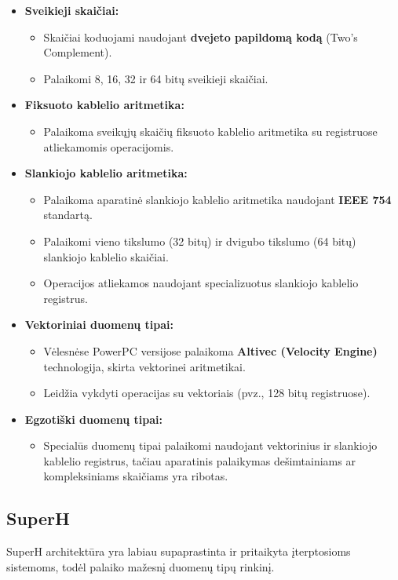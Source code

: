 \documentclass{article}
\begin{document}
\begin{itemize}
    \item \textbf{Sveikieji skaičiai:}
        \begin{itemize}
            \item Skaičiai koduojami naudojant \textbf{dvejeto papildomą kodą} (Two's Complement).
            \item Palaikomi 8, 16, 32 ir 64 bitų sveikieji skaičiai.
        \end{itemize}
    \item \textbf{Fiksuoto kablelio aritmetika:}
        \begin{itemize}
            \item Palaikoma sveikųjų skaičių fiksuoto kablelio aritmetika su registruose atliekamomis operacijomis.
        \end{itemize}
    \item \textbf{Slankiojo kablelio aritmetika:}
        \begin{itemize}
            \item Palaikoma aparatinė slankiojo kablelio aritmetika naudojant \textbf{IEEE 754} standartą.
            \item Palaikomi vieno tikslumo (32 bitų) ir dvigubo tikslumo (64 bitų) slankiojo kablelio skaičiai.
            \item Operacijos atliekamos naudojant specializuotus slankiojo kablelio registrus.
        \end{itemize}
    \item \textbf{Vektoriniai duomenų tipai:}
        \begin{itemize}
            \item Vėlesnėse PowerPC versijose palaikoma \textbf{Altivec (Velocity Engine)} technologija, skirta vektorinei aritmetikai.
            \item Leidžia vykdyti operacijas su vektoriais (pvz., 128 bitų registruose).
        \end{itemize}
    \item \textbf{Egzotiški duomenų tipai:}
        \begin{itemize}
            \item Specialūs duomenų tipai palaikomi naudojant vektorinius ir slankiojo kablelio registrus, tačiau aparatinis palaikymas dešimtainiams ar kompleksiniams skaičiams yra ribotas.
        \end{itemize}
\end{itemize}

\subsection{SuperH}
SuperH architektūra yra labiau supaprastinta ir pritaikyta įterptosioms sistemoms, todėl palaiko mažesnį duomenų tipų rinkinį.
\end{document}
